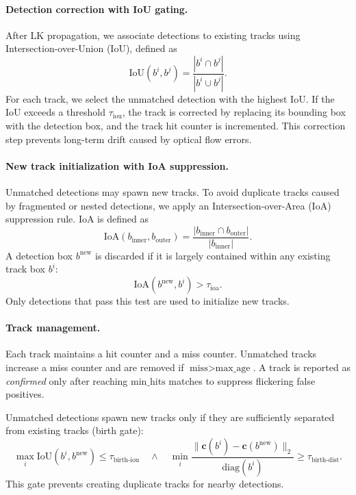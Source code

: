 \paragraph{Detection correction with IoU gating.}
After LK propagation, we associate detections to existing tracks using
Intersection-over-Union (IoU), defined as
\begin{equation}
\text{IoU}(b^i, b^j) = \frac{|b^i \cap b^j|}{|b^i \cup b^j|}.
\end{equation}
For each track, we select the unmatched detection with the highest IoU.
If the IoU exceeds a threshold $\tau_{\text{iou}}$, the track is corrected by
replacing its bounding box with the detection box, and the track hit counter is
incremented.
This correction step prevents long-term drift caused by optical flow errors.

\paragraph{New track initialization with IoA suppression.}
Unmatched detections may spawn new tracks.
To avoid duplicate tracks caused by fragmented or nested detections,
we apply an Intersection-over-Area (IoA) suppression rule.
IoA is defined as
\begin{equation}
\text{IoA}(b_{\text{inner}}, b_{\text{outer}})
= \frac{|b_{\text{inner}} \cap b_{\text{outer}}|}{|b_{\text{inner}}|}.
\end{equation}
A detection box $b^{\text{new}}$ is discarded if it is largely contained within
any existing track box $b^i$:
\begin{equation}
\text{IoA}(b^{\text{new}}, b^i) > \tau_{\text{ioa}}.
\end{equation}
Only detections that pass this test are used to initialize new tracks.

\paragraph{Track management.}
Each track maintains a hit counter and a miss counter.
Unmatched tracks increase a miss counter and are removed if
$\text{miss}>\text{max\_age}$.
A track is reported as \emph{confirmed} only after reaching
$\text{min\_hits}$ matches to suppress flickering false positives.

Unmatched detections spawn new tracks only if they are sufficiently
separated from existing tracks (birth gate):
\begin{equation}
\max_i \text{IoU}(b^i,b^{\text{new}}) \le \tau_{\text{birth-iou}}
\quad\wedge\quad
\min_i \frac{\|\mathbf{c}(b^i)-\mathbf{c}(b^{\text{new}})\|_2}{\text{diag}(b^i)}
\ge \tau_{\text{birth-dist}}.
\end{equation}
This gate prevents creating duplicate tracks for nearby detections.

